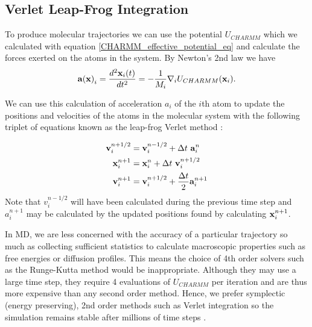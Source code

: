 \subsection{ Verlet Leap-Frog Integration}
To produce molecular trajectories we can use the potential $U_{CHARMM}$ which we calculated with equation \ref{CHARMM_effective_potential_eq} and calculate the forces exerted on the atoms in the system.  By Newton's 2nd law we have 
\begin{equation}
	\bold{a(\bold{x})}_i = \frac{d^2 \bold{x}_i(t)}{dt^2} = - \frac{1}{M_i} \nabla_i U_{CHARMM}(\bold{x}_i).
\end{equation}
 
We can use this calculation of acceleration $a_i$ of the $i$th atom to update the positions and velocities of the atoms in the molecular system with the following triplet of equations known as the leap-frog Verlet method \cite{schlick2010}:

\begin{equation} \label {leap-frog_equation}
	\begin{aligned}
		\bold{v}_i^{n+1/2} &= \bold{v}_i^{n-1/2} + \Delta t\  \bold{a}_i^n \\
		\bold{x}^{n+1}_i &= \bold{x}_i^{n} + \Delta t\  \bold{v}_i^{n+1/2}  \\
		\bold{v}^{n+1}_i &= \bold{v}_i^{n+1/2} + \frac{\Delta t} {2} \bold{a}_i^{n+1} \\
	\end{aligned}
 \end{equation}
 Note that $v_i^{n-1/2}$ will have  been calculated during the previous time step and $a_i^{n+1}$ may be  calculated by the updated positions found by calculating  $\bold{x}^{n+1}_i$.

 In MD, we are less concerned with the accuracy of a particular trajectory so much as collecting sufficient statistics to calculate macroscopic properties such as free energies or diffusion profiles. This means the choice of 4th order solvers such as the Runge-Kutta method would be inappropriate. Although they may use a large time step, they require 4 evaluations of $U_{CHARMM}$ per iteration and are thus more expensive than any second order method. Hence, we prefer symplectic (energy preserving), 2nd order methods such as Verlet integration so the simulation remains stable after millions of time steps \cite{streett1978}. 

